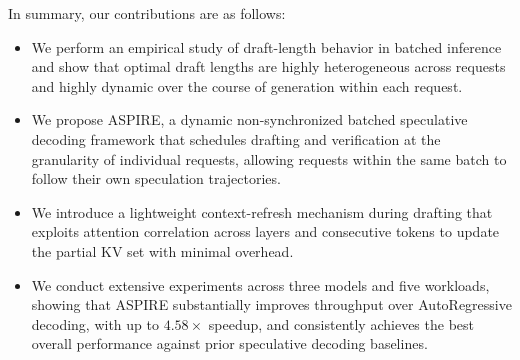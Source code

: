 In summary, our contributions are as follows:
\begin{itemize}
    \item We perform an empirical study of draft-length behavior in batched inference and show that optimal draft lengths are highly heterogeneous across requests and highly dynamic over the course of generation within each request.
    \item We propose ASPIRE, a dynamic non-synchronized batched speculative decoding framework that schedules drafting and verification at the granularity of individual requests, allowing requests within the same batch to follow their own speculation trajectories.
    \item We introduce a lightweight context-refresh mechanism during drafting that exploits attention correlation across layers and consecutive tokens to update the partial KV set with minimal overhead.
    \item We conduct extensive experiments across three models and five workloads, showing that ASPIRE substantially improves throughput over AutoRegressive decoding, with up to $4.58\times$ speedup, and consistently achieves the best overall performance against prior speculative decoding baselines.
\end{itemize}
